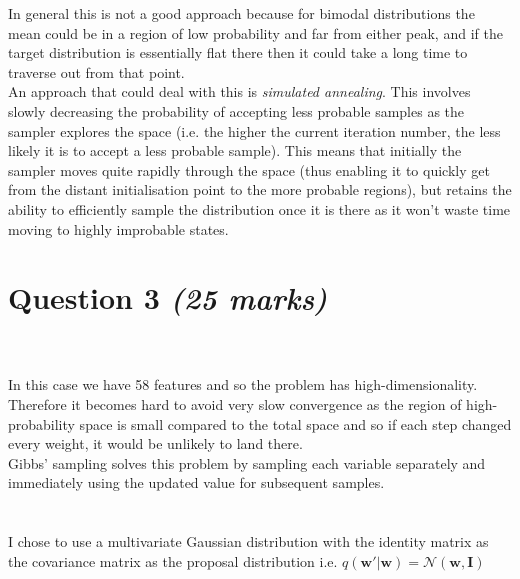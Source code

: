 \documentclass[paper=a4, fontsize=11pt]{scrartcl} %
\numberwithin{equation}{section} %
\numberwithin{figure}{section} %
\numberwithin{table}{section} %
\begin{document}
In general this is not a good approach because for bimodal distributions the mean could be in a region of low probability and far from either peak, and if the target distribution is essentially flat there then it could take a long time to traverse out from that point.\\

An approach that could deal with this is \textit{simulated annealing}. This involves slowly decreasing the probability of accepting less probable samples as the sampler explores the space (i.e. the higher the current iteration number, the less likely it is to accept a less probable sample). This means that initially the sampler moves quite rapidly through the space (thus enabling it to quickly get from the distant initialisation point to the more probable regions), but retains the ability to efficiently sample the distribution once it is there as it won't waste time moving to highly improbable states.\\

\section{\textbf{Question 3 \textit{(25 marks)}}}

\\
\\
In this case we have 58 features and so the problem has high-dimensionality. Therefore it becomes hard to avoid very slow convergence as the region of high-probability space is small compared to the total space and so if each step changed every weight, it would be unlikely to land there.\\

Gibbs' sampling solves this problem by sampling each variable separately and immediately using the updated value for subsequent samples.\\

\\
\\
I chose to use a multivariate Gaussian distribution with the identity matrix as the covariance matrix as the proposal distribution i.e. $q(\mathbf{w'}|\mathbf{w})=\mathcal{N}(\mathbf{w},\mathbf{I})$\\
\end{document}
